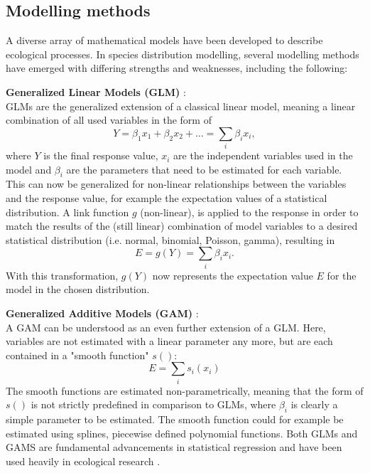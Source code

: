 \documentclass[12pt,a4paper]{article}
\begin{document}
\subsection{Modelling methods}
A diverse array of mathematical models have been developed to describe ecological processes.
In species distribution modelling, several modelling methods have emerged with differing strengths and weaknesses, including the following:

\textbf{Generalized Linear Models (GLM)} \autocite{nelder1972glm}:\\
GLMs are the generalized extension of a classical linear model, meaning a linear combination of all used variables in the form of
\begin{equation}
    \label{eq:lm}
    Y = \beta_1 x_1 + \beta_2 x_2 + \dots = \sum_{i} \beta_i x_i,
\end{equation}
where $Y$ is the final response value, $x_i$ are the independent variables used in the model and $\beta_i$ are the parameters that need to be estimated for each variable.
This can now be generalized for non-linear relationships between the variables and the response value, for example the expectation values of a statistical distribution.
A link function $g$ (non-linear), is applied to the response in order to match the results of the (still linear) combination of model variables to a desired statistical distribution (i.e. normal, binomial, Poisson, gamma), resulting in
\begin{equation}
    \label{eq:glm}
    E = g(Y) = \sum_{i} \beta_i x_i .
\end{equation}
With this transformation, $g(Y)$ now represents the expectation value $E$ for the model in the chosen distribution.

\textbf{Generalized Additive Models (GAM)} \autocite{hastie1986gam}:\\
A GAM can be understood as an even further extension of a GLM. Here, variables are not estimated with a linear parameter any more, but are each contained in a "smooth function" $s()$:
\begin{equation}
    \label{eq:gam}
    E = \sum_{i} s_i(x_i)
\end{equation}
The smooth functions are estimated non-parametrically, meaning that the form of $s()$ is not strictly predefined in comparison to GLMs, where $\beta_i$ is clearly a simple parameter to be estimated.
The smooth function could for example be estimated using splines, piecewise defined polynomial functions.
Both GLMs and GAMS are fundamental advancements in statistical regression and have been used heavily in ecological research \autocite{guisan2002glm-gam}.
\end{document}
